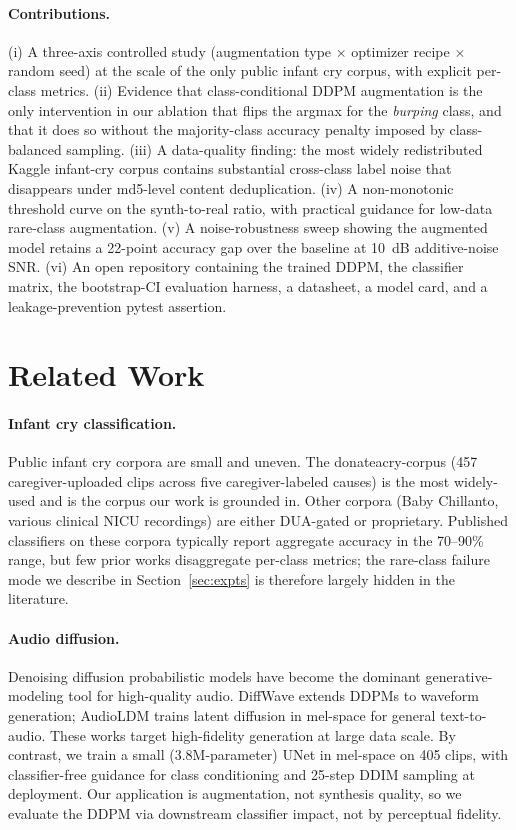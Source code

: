 \documentclass[final]{article}
\begin{document}
\paragraph{Contributions.}
(i) A three-axis controlled study (augmentation type $\times$ optimizer recipe $\times$ random seed) at the scale of the only public infant cry corpus, with explicit per-class metrics. (ii) Evidence that class-conditional DDPM augmentation is the only intervention in our ablation that flips the argmax for the \textit{burping} class, and that it does so without the majority-class accuracy penalty imposed by class-balanced sampling. (iii) A data-quality finding: the most widely redistributed Kaggle infant-cry corpus contains substantial cross-class label noise that disappears under md5-level content deduplication. (iv) A non-monotonic threshold curve on the synth-to-real ratio, with practical guidance for low-data rare-class augmentation. (v) A noise-robustness sweep showing the augmented model retains a 22-point accuracy gap over the baseline at 10~dB additive-noise SNR. (vi) An open repository containing the trained DDPM, the classifier matrix, the bootstrap-CI evaluation harness, a datasheet, a model card, and a leakage-prevention pytest assertion.

\section{Related Work}\label{sec:past}

\paragraph{Infant cry classification.} Public infant cry corpora are small and uneven. The donateacry-corpus \cite{donateacry} (457 caregiver-uploaded clips across five caregiver-labeled causes) is the most widely-used and is the corpus our work is grounded in. Other corpora (Baby Chillanto, various clinical NICU recordings) are either DUA-gated or proprietary. Published classifiers on these corpora typically report aggregate accuracy in the 70--90\% range, but few prior works disaggregate per-class metrics; the rare-class failure mode we describe in Section~\ref{sec:expts} is therefore largely hidden in the literature.

\paragraph{Audio diffusion.} Denoising diffusion probabilistic models \cite{ho2020denoising} have become the dominant generative-modeling tool for high-quality audio. DiffWave \cite{kong2021diffwave} extends DDPMs to waveform generation; AudioLDM \cite{liu2023audioldm} trains latent diffusion in mel-space for general text-to-audio. These works target high-fidelity generation at large data scale. By contrast, we train a small (3.8M-parameter) UNet in mel-space on 405 clips, with classifier-free guidance \cite{ho2021classifier} for class conditioning and 25-step DDIM \cite{song2021ddim} sampling at deployment. Our application is augmentation, not synthesis quality, so we evaluate the DDPM via downstream classifier impact, not by perceptual fidelity.
\end{document}
